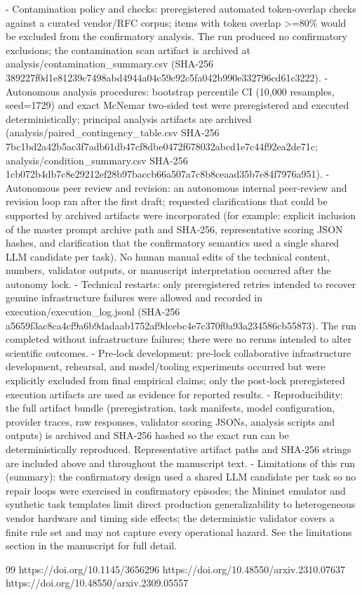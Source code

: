 \documentclass[conference]{IEEEtran}
\begin{document}
- Contamination policy and checks: preregistered automated token‑overlap checks against a curated vendor/RFC corpus; items with token overlap >=80\% would be excluded from the confirmatory analysis. The run produced no confirmatory exclusions; the contamination scan artifact is archived at analysis/contamination\_summary.csv (SHA‑256 389227f0d1e81239c7498abd4944a04c59c92c5fa042b990e332796cd61c3222).
- Autonomous analysis procedures: bootstrap percentile CI (10,000 resamples, seed=1729) and exact McNemar two‑sided test were preregistered and executed deterministically; principal analysis artifacts are archived (analysis/paired\_contingency\_table.csv SHA‑256 7bc1bd2a42b5ac3f7adb61db47cf8dbe0472f678032abcd1e7c44f92ea2de71c; analysis/condition\_summary.csv SHA‑256 1cb072b4db7c8e29212ef28b97baccb66a507a7c8b8ceaad35b7e84f7976a951).
- Autonomous peer review and revision: an autonomous internal peer‑review and revision loop ran after the first draft; requested clarifications that could be supported by archived artifacts were incorporated (for example: explicit inclusion of the master prompt archive path and SHA‑256, representative scoring JSON hashes, and clarification that the confirmatory semantics used a single shared LLM candidate per task). No human manual edits of the technical content, numbers, validator outputs, or manuscript interpretation occurred after the autonomy lock.
- Technical restarts: only preregistered retries intended to recover genuine infrastructure failures were allowed and recorded in execution/execution\_log.jsonl (SHA‑256 a5659f3ac8ca4cf9a6b9dadaab1752af9dcebc4e7c370f0a93a234586cb55873). The run completed without infrastructure failures; there were no reruns intended to alter scientific outcomes.
- Pre‑lock development: pre‑lock collaborative infrastructure development, rehearsal, and model/tooling experiments occurred but were explicitly excluded from final empirical claims; only the post‑lock preregistered execution artifacts are used as evidence for reported results.
- Reproducibility: the full artifact bundle (preregistration, task manifests, model configuration, provider traces, raw responses, validator scoring JSONs, analysis scripts and outputs) is archived and SHA‑256 hashed so the exact run can be deterministically reproduced. Representative artifact paths and SHA‑256 strings are included above and throughout the manuscript text.
- Limitations of this run (summary): the confirmatory design used a shared LLM candidate per task so no repair loops were exercised in confirmatory episodes; the Mininet emulator and synthetic task templates limit direct production generalizability to heterogeneous vendor hardware and timing side effects; the deterministic validator covers a finite rule set and may not capture every operational hazard. See the limitations section in the manuscript for full detail.

\begin{thebibliography}{99}
 https://doi.org/10.1145/3656296
 https://doi.org/10.48550/arxiv.2310.07637
 https://doi.org/10.48550/arxiv.2309.05557
\end{thebibliography}
\end{document}
